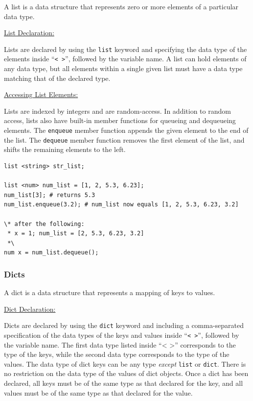 \documentclass{article}
\newcommand{\code}[1]{\texttt{#1}} %
\begin{document}
A list is a data structure that represents zero or more elements of a particular data type. 

\underline{List Declaration:}

Lists are declared by using the \code{list} keyword and specifying the data type of the elements inside ``\code{< >}'', followed by the variable name. A list can hold elements of any data type, but all elements within a single given list must have a data type matching that of the declared type. 

\underline{Accessing List Elements:}

Lists are indexed by integers and are random-access. In addition to random access, lists also have built-in member functions for queueing and dequeueing elements. The \code{enqueue} member function appends the given element to the end of the list. The \code{dequeue} member function removes the first element of the list, and shifts the remaining elements to the left. 

\begin{lstlisting}[language=pltLang, caption=The ``list'' type., label=lst:list]
list <string> str_list;

list <num> num_list = [1, 2, 5.3, 6.23];
num_list[3]; # returns 5.3
num_list.enqueue(3.2); # num_list now equals [1, 2, 5.3, 6.23, 3.2]

\* after the following:
 * x = 1; num_list = [2, 5.3, 6.23, 3.2]
 *\
num x = num_list.dequeue();
\end{lstlisting}

\subsubsection{Dicts}

A dict is a data structure that represents a mapping of keys to values. 

\underline{Dict Declaration:}

Dicts are declared by using the \code{dict} keyword and including a comma-separated specification of the data types of the keys and values inside ``\code{< >}'', followed by the variable name. The first data type listed inside ``< >'' corresponds to the type of the keys, while the second data type corresponds to the type of the values. The data type of dict keys can be any type \emph{except} \code{list} or \code{dict}. There is no restriction on the data type of the values of dict objects. Once a dict has been declared, all keys must be of the same type as that declared for the key, and all values must be of the same type as that declared for the value. 
\end{document}
